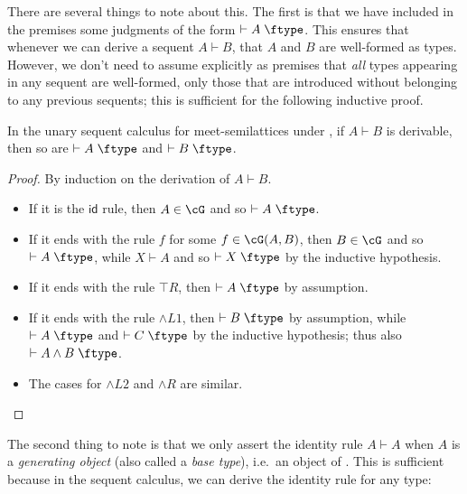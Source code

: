 \documentclass{book}
\def\idfunc{\mathsf{id}}
\let\types\vdash
\def\type{\;\ftype}
\let\meet\wedge
\def\meetL{\mathord{\meet}L}
\def\meetR{\mathord{\meet}R}
\begin{document}
There are several things to note about this.
The first is that we have included in the premises some judgments of the form $\types A\type$.
This ensures that whenever we can derive a sequent $A\types B$, that $A$ and $B$ are well-formed as types.
However, we don't need to assume explicitly as premises that \emph{all} types appearing in any sequent are well-formed, only those that are introduced without belonging to any previous sequents; this is sufficient for the following inductive proof.

\begin{thm}\label{thm:seqcalc-mslat-wftype}
  In the unary sequent calculus for meet-semilattices under \cG, if $A\types B$ is derivable, then so are $\types A\type$ and $\types B\type$.
\end{thm}
\begin{proof}
  By induction on the derivation of $A\types B$.
  \begin{itemize}
  \item If it is the $\idfunc$ rule, then $A\in\cG$ and so $\types A\type$.
  \item If it ends with the rule $f$ for some $f\in\cG(A,B)$, then $B\in \cG$ and so $\types A\type$, while $X\types A$ and so $\types X\type$ by the inductive hypothesis.
  \item If it ends with the rule $\top R$, then $\types A\type$ by assumption.
  \item If it ends with the rule $\meetL1$, then $\types B\type$ by assumption, while $\types A\type$ and $\types C\type$ by the inductive hypothesis; thus also $\types A\meet B\type$.
  \item The cases for $\meetL2$ and $\meetR$ are similar.\qedhere
  \end{itemize}
\end{proof}

The second thing to note is that we only assert the identity rule $A\types A$ when $A$ is a \emph{generating object} (also called a \emph{base type}), i.e.\ an object of \cG.
This is sufficient because in the sequent calculus, we can derive the identity rule for any type:
\end{document}
